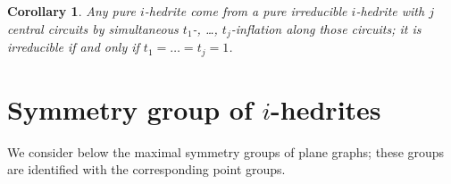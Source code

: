 \documentclass[12pt]{article}
\newtheorem{corollary}{Corollary}
\begin{document}
\begin{corollary}
Any pure $i$-hedrite come from a pure irreducible $i$-hedrite with $j$ central circuits by simultaneous $t_1$-, \dots, $t_j$-inflation along those circuits; it is irreducible if and only if $t_1=\dots=t_j=1$.



\end{corollary}





\section{Symmetry group of $i$-hedrites}
We consider below the maximal symmetry groups of plane graphs; these groups are identified with the corresponding point groups.



%
%
%
\end{document}
